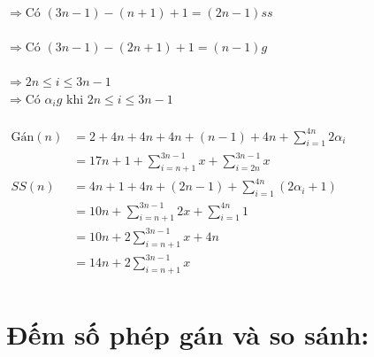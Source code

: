 \documentclass[12pt, letterpaper]{article}
\begin{document}
$\Rightarrow \text{Có } (3n - 1) - (n + 1) + 1 = (2n - 1)ss$ \\
 \\
$\Rightarrow \text{Có } (3n - 1) - (2n + 1) + 1 = (n - 1)g$ \\
 \\
$\Rightarrow 2n \leq i \leq 3n - 1$ \\
$\Rightarrow \text{Có } \alpha_ig \text{ khi }  2n \leq i \leq 3n - 1$\\
 \\
$ \begin{aligned}
		\text{Gán}(n) & = 2 + 4n + 4n + 4n + (n - 1) + 4n + \sum^{4n}_{i = 1} 2 \alpha_i \\
		              & = 17n + 1 + \sum^{3n-1}_{i = n + 1} x + \sum^{3n-1}_{i = 2n} x   \\
		SS(n)         & = 4n + 1 + 4n + (2n - 1) + \sum^{4n}_{i = 1} (2 \alpha_i + 1)    \\
		              & = 10n + \sum^{3n-1}_{i = n + 1} 2x + \sum^{4n}_{i = 1} 1         \\
		              & = 10n + 2 \sum^{3n-1}_{i = n + 1} x + 4n                         \\
		              & = 14n + 2 \sum^{3n-1}_{i = n + 1} x                              \\
	\end{aligned} $ \\

\section{Đếm số phép gán và so sánh:}
\end{document}

